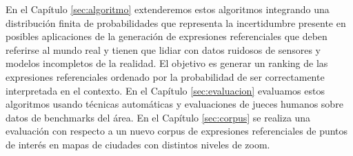 En el Cap\'itulo \ref{sec:algoritmo} extenderemos estos algoritmos integrando una distribuci\'on finita de probabilidades que representa la incertidumbre presente en posibles aplicaciones de la generaci\'on de expresiones referenciales que deben referirse al mundo real y tienen que lidiar con datos ruidosos de sensores y modelos incompletos de la realidad. El objetivo es generar un ranking de las expresiones referenciales ordenado por la probabilidad de ser correctamente interpretada en el contexto. En el Cap\'itulo \ref{sec:evaluacion} evaluamos estos algoritmos usando t\'ecnicas autom\'aticas y evaluaciones de jueces humanos sobre datos de benchmarks del \'area. En el Cap\'itulo \ref{sec:corpus} se realiza una evaluaci\'on con respecto a un nuevo corpus de expresiones referenciales de puntos de inter\'es en mapas de ciudades con distintos niveles de zoom. 



